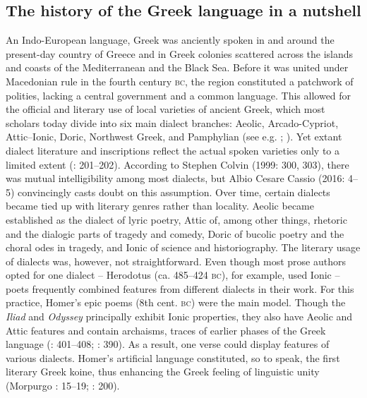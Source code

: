 \documentclass[output=paper]{langsci/langscibook}
\begin{document}
\subsection{The history of the Greek language in a nutshell}
\hypertarget{Toc19704803}{}
An Indo-European language, Greek was anciently spoken in and around the present-day country of Greece and in Greek colonies scattered across the islands and coasts of the Mediterranean and the Black Sea. Before it was united under Macedonian rule in the fourth century \textsc{bc}, the region constituted a patchwork of polities, lacking a central government and a common language. This allowed for the official and literary use of local varieties of ancient Greek, which most scholars today divide into six main dialect branches: Aeolic, Arcado-Cypriot, Attic–Ionic, Doric, Northwest Greek, and Pamphylian (see e.g. \citealt{Colvin2010}; \citealt{Finkelberg2014}). Yet extant dialect literature and inscriptions reflect the actual spoken varieties only to a limited extent (\citealt{Colvin2010}: 201–202). According to Stephen Colvin (1999: 300, 303), there was mutual intelligibility among most dialects, but Albio Cesare Cassio (2016: 4–5) convincingly casts doubt on this assumption. Over time, certain dialects became tied up with literary genres rather than locality. Aeolic became established as the dialect of lyric poetry, Attic of, among other things, rhetoric and the dialogic parts of tragedy and comedy, Doric of bucolic poetry and the choral odes in tragedy, and Ionic of science and historiography. The literary usage of dialects was, however, not straightforward. Even though most prose authors opted for one dialect – Herodotus (ca. 485–424 \textsc{bc}), for example, used Ionic – poets frequently combined features from different dialects in their work. For this practice, Homer’s epic poems (8th cent. \textsc{bc}) were the main model. Though the \textit{Iliad} and \textit{Odyssey} principally exhibit Ionic properties, they also have Aeolic and Attic features and contain archaisms, traces of earlier phases of the Greek language (\citealt{Hackstein2010}: 401–408; \citealt{Tribulato2010}: 390). As a result, one verse could display features of various dialects. Homer’s artificial language constituted, so to speak, the first literary Greek koine, thus enhancing the Greek feeling of linguistic unity (Morpurgo \citealt{Davies1987}: 15–19; \citealt{Colvin2010}: 200).
\end{document}
